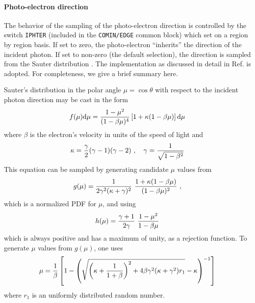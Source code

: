\paragraph{Photo-electron direction}\hfill
\label{photo_direction}

The behavior of the sampling of the photo-electron direction 
is controlled by the switch {\tt IPHTER} 
(included in the {\tt COMIN/EDGE} common block) which set on a 
region by region basis. If set to zero, 
the photo-electron ``inherits'' the direction of the incident 
photon. If set to non-zero (the default selection), 
the direction is sampled from the 
Sauter distribution \cite{Sa31}. The implementation as discussed 
in detail in Ref. \cite{BR86a} is adopted. For completeness, we give a 
brief summary here.

Sauter's distribution in the polar angle 
$\mu = \cos \theta$ with respect to the incident 
photon direction may be cast in the form \cite{BR86a}
\begin{equation}
f(\mu) {\rm d}\mu = {1 - \mu^2 \over (1 - \beta \mu)^4} \left[ 1 + 
\kappa (1 - \beta \mu) \right] {\rm d} \mu
\end{equation}
where $\beta$ is the electron's velocity in units of the 
speed of light  and 
\begin{equation}
\kappa = {\gamma \over 2} (\gamma - 1) (\gamma - 2)~, \quad \gamma = 
{1 \over \sqrt{1 - \beta^2} }
\end{equation}
This equation can be sampled by generating candidate 
$\mu$ values from 
\begin{equation}
g(\mu) = {1 \over 2 \gamma^2 (\kappa + \gamma)^2} ~{
1 + \kappa (1 - \beta \mu) \over (1 - \beta \mu)^2 }~,
\end{equation}
which is a normalized PDF for $\mu$, and using 
\begin{equation}
h(\mu) = { \gamma + 1 \over 2 \gamma } ~{1 - \mu^2 \over 1 - \beta \mu }
\end{equation}
which is always positive and has a maximum of unity, 
as a rejection function. To generate $\mu$ values from 
$g(\mu)$, one uses
\begin{equation}
\mu = {1 \over \beta} \left[1 - \left( \sqrt{\left(\kappa + {1 \over 1 + \beta}
\right)^2 + 4 \beta \gamma^2 (\kappa + \gamma^2) r_1} - \kappa \right)^{-1} 
\right]
\end{equation}
where $r_1$ is an uniformly distributed random number. 

